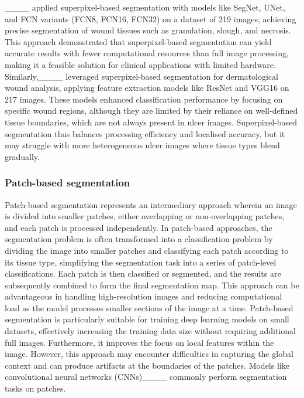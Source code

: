 ____ applied superpixel-based segmentation with models like SegNet, UNet, and FCN variants (FCN8, FCN16, FCN32) on a dataset of 219 images, achieving precise segmentation of wound tissues such as granulation, slough, and necrosis. This approach demonstrated that superpixel-based segmentation can yield accurate results with fewer computational resources than full image processing, making it a feasible solution for clinical applications with limited hardware.
Similarly,____ leveraged superpixel-based segmentation for dermatological wound analysis, applying feature extraction models like ResNet and VGG16 on 217 images. These models enhanced classification performance by focusing on specific wound regions, although they are limited by their reliance on well-defined tissue boundaries, which are not always present in ulcer images. Superpixel-based segmentation thus balances processing efficiency and localised accuracy, but it may struggle with more heterogeneous ulcer images where tissue types blend gradually. 

\subsubsection{Patch-based segmentation}
Patch-based segmentation represents an intermediary approach wherein an image is divided into smaller patches, either overlapping or non-overlapping patches, and each patch is processed independently.
In patch-based approaches, the segmentation problem is often transformed into a classification problem by dividing the image into smaller patches and classifying each patch according to its tissue type, simplifying the segmentation task into a series of patch-level classifications.
Each patch is then classified or segmented, and the results are subsequently combined to form the final segmentation map. This approach can be advantageous in handling high-resolution images and reducing computational load as the model processes smaller sections of the image at a time. Patch-based segmentation is particularly suitable for training deep learning models on small datasets, effectively increasing the training data size without requiring additional full images.
Furthermore, it improves the focus on local features within the image. However, this approach may encounter difficulties in capturing the global context and can produce artifacts at the boundaries of the patches. Models like convolutional neural networks (CNNs)____ commonly perform segmentation tasks on patches.

